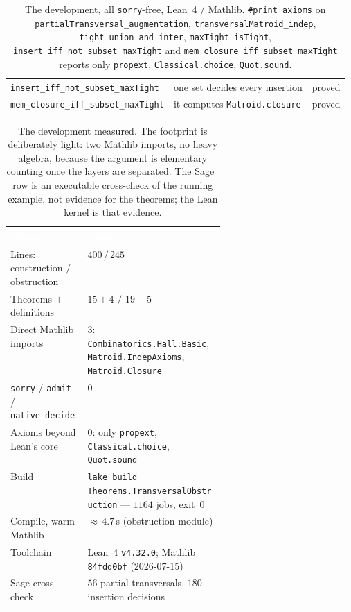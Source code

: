 \documentclass[11pt]{article}
\newcommand{\lean}[1]{\texttt{#1}}
\begin{document}
\begin{table}[H]
\begin{tabular}{@{}llc@{}}
    \rowcolor{tmband}
    \lean{insert\_iff\_not\_subset\_maxTight} & one set decides every insertion & proved \\
    \rowcolor{tmband}
    \lean{mem\_closure\_iff\_subset\_maxTight} & it computes \lean{Matroid.closure} & proved \\
    \bottomrule
  \end{tabular}
  \caption{The development, all \lean{sorry}-free, Lean~4 / Mathlib. \lean{\#print axioms} on
  \lean{partialTransversal\_augmentation}, \lean{transversalMatroid\_indep},
  \lean{tight\_union\_and\_inter}, \lean{maxTight\_isTight},
  \lean{insert\_iff\_not\_subset\_maxTight} and \lean{mem\_closure\_iff\_subset\_maxTight}
  reports only \lean{propext}, \lean{Classical.choice}, \lean{Quot.sound}.}
  \label{tab:results}
\end{table}

\begin{table}[H]
  \centering\footnotesize
  \begin{tabularx}{0.96\linewidth}{@{}>{\raggedright\arraybackslash}p{0.36\linewidth}X@{}}
    \toprule
    \rowcolor{tmteal}
    \textcolor{white}{\textbf{Quantity}} & \textcolor{white}{\textbf{Value}} \\
    \midrule
    \rowcolor{tmband}
    Lines: construction $/$ obstruction & $400\,/\,245$ \\
    Theorems $+$ definitions & $15{+}4$ $/$ $19{+}5$ \\
    \rowcolor{tmband}
    Direct Mathlib imports & $3$: \lean{Combinatorics.Hall.Basic},
      \lean{Matroid.IndepAxioms}, \lean{Matroid.Closure} \\
    \lean{sorry} / \lean{admit} / \lean{native\_decide} & $0$ \\
    \rowcolor{tmband}
    Axioms beyond Lean's core & $0$: only \lean{propext}, \lean{Classical.choice},
      \lean{Quot.sound} \\
    Build & \lean{lake build}
      \lean{Theorems.TransversalObstruction} --- $1164$ jobs, exit~$0$ \\
    \rowcolor{tmband}
    Compile, warm Mathlib & ${\approx}\,4.7$\,s (obstruction module) \\
    Toolchain & Lean~4 \lean{v4.32.0}; Mathlib \lean{84fdd0bf} (2026-07-15) \\
    \rowcolor{tmband}
    Sage cross-check & $56$ partial transversals, $180$ insertion decisions \\
    \bottomrule
  \end{tabularx}
  \caption{The development measured. The footprint is deliberately light: two Mathlib imports, no
  heavy algebra, because the argument is elementary counting once the layers are separated. The
  Sage~\cite{sage} row is an executable cross-check of the running example, not evidence for the
  theorems; the Lean kernel is that evidence.}
  \label{tab:metrics}
\end{table}
\end{document}
